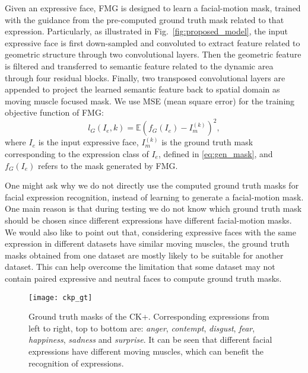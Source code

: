 \documentclass[conference,a4paper]{IEEEtran}
\begin{document}
Given an expressive face, FMG is designed to learn a facial-motion mask, trained with the guidance from the pre-computed ground truth mask related to that expression. Particularly, as illustrated in Fig.~\ref{fig:proposed_model}, the input expressive face is first down-sampled and convoluted to extract feature related to geometric structure through two convolutional layers. Then the geometric feature is filtered and transferred to semantic feature related to the dynamic area through four residual blocks. Finally, two transposed convolutional layers are appended to project the learned semantic feature back to spatial domain as moving muscle focused mask. We use MSE (mean square error) for the training objective function of FMG: 
\begin{equation}
\label{eq:loss_mask}
l_G(I_e, k) = \mathbb{E} (f_G(I_e) - I_m^{(k)})^2,
\end{equation}
where $I_e$ is the input expressive face, $I_m^{(k)}$ is the ground truth mask corresponding to the expression class of $I_e$, defined in \eqref{eq:gen_mask}, and $f_G(I_e)$ refers to the mask generated by FMG. 

One might ask why we do not directly use the computed ground truth masks for facial expression recognition, instead of learning to generate a facial-motion mask. One main reason is that during testing we do not know which ground truth mask should be chosen since different expressions have different facial-motion masks. We would also like to point out that, considering expressive faces with the same expression in different datasets have similar moving muscles, the ground truth masks obtained from one dataset are mostly likely to be suitable for another dataset. This can help overcome the limitation that some dataset may not contain paired expressive and neutral faces to compute ground truth masks.



\begin{figure}[t!]
    \centering
    \texttt{[image: ckp\_gt]}
    \caption{Ground truth masks of the CK+. Corresponding expressions from left to right, top to bottom are: \textit{anger}, \textit{contempt}, \textit{disgust}, \textit{fear}, \textit{happiness}, \textit{sadness} and \textit{surprise}. It can be seen that different facial expressions have different moving muscles, which can benefit the recognition of expressions.}\label{fig:ckp_gt}
\end{figure}
\end{document}
